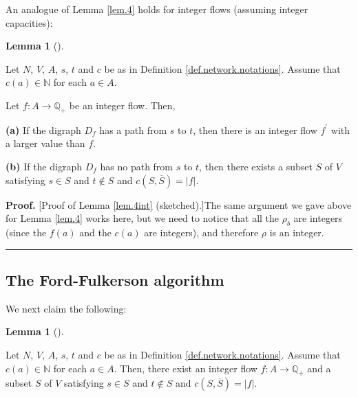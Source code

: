 \documentclass[numbers=enddot,12pt,final,onecolumn,notitlepage]{scrartcl}%
\theoremstyle{definition}
\newtheorem{lem}[theo]{Lemma}
\newenvironment{lemma}[1][]
{\begin{lem}[#1]\begin{leftbar}}
{\end{leftbar}\end{lem}}
\newenvironment{proof}[1][Proof]{\noindent\textbf{#1.} }{\ \rule{0.5em}{0.5em}}
\begin{document}
An analogue of Lemma \ref{lem.4} holds for integer flows (assuming integer capacities):

\begin{lemma}
\label{lem.4int}Let $N$, $V$, $A$, $s$, $t$ and $c$ be as in Definition
\ref{def.network.notations}. Assume that $c\left(  a\right)  \in\mathbb{N}$
for each $a\in A$.

Let $f:A\rightarrow\mathbb{Q}_{+}$ be an integer flow. Then,

\textbf{(a)} If the digraph $D_{f}$ has a path from $s$ to $t$, then there is
an integer flow $f^{\prime}$ with a larger value than $f$.

\textbf{(b)} If the digraph $D_{f}$ has no path from $s$ to $t$, then there
exists a subset $S$ of $V$ satisfying $s\in S$ and $t\notin S$ and $c\left(
S,\overline{S}\right)  =\left\vert f\right\vert $.
\end{lemma}

\begin{proof}
[Proof of Lemma \ref{lem.4int} (sketched).]The same argument we gave above for
Lemma \ref{lem.4} works here, but we need to notice that all the $\rho_{b}$
are integers (since the $f\left(  a\right)  $ and the $c\left(  a\right)  $
are integers), and therefore $\rho$ is an integer.
\end{proof}

\subsection{The Ford-Fulkerson algorithm}

We next claim the following:

\begin{lemma}
\label{lem.3bat}Let $N$, $V$, $A$, $s$, $t$ and $c$ be as in Definition
\ref{def.network.notations}. Assume that $c\left(  a\right)  \in\mathbb{N}$
for each $a\in A$. Then, there exist an integer flow $f:A\rightarrow
\mathbb{Q}_{+}$ and a subset $S$ of $V$ satisfying $s\in S$ and $t\notin S$
and $c\left(  S,\overline{S}\right)  =\left\vert f\right\vert $.
\end{lemma}
\end{document}
